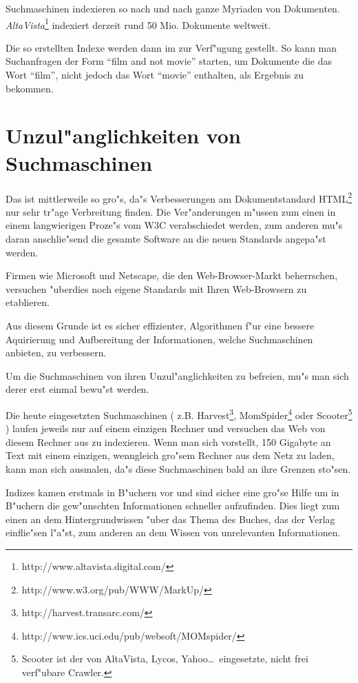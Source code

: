 Suchmaschinen indexieren so nach und nach ganze Myriaden von Dokumenten. {\em AltaVista}\footnote{http://www.altavista.digital.com/} indexiert derzeit rund 50 Mio. Dokumente weltweit.

Die so erstellten Indexe werden dann im \www zur Verf"ugung gestellt. So kann man Suchanfragen der Form "`film and not movie"'  starten, um Dokumente die das Wort "`film"', nicht jedoch das Wort "`movie"' enthalten, als Ergebnis zu bekommen.


\section{Unzul"anglichkeiten von Suchmaschinen}
Das \www ist mittlerweile so gro"s, da"s Verbesserungen am Dokumentstandard HTML\footnote{http://www.w3.org/pub/WWW/MarkUp/} nur sehr tr"age Verbreitung finden. Die Ver"anderungen m"ussen zum einen in einem langwierigen Proze"s vom W3C verabschiedet werden, zum anderen mu"s daran anschlie"send die gesamte Software an die neuen Standards angepa"st werden.

Firmen wie Microsoft und Netscape, die den Web-Browser-Markt beherrschen, versuchen "uberdies noch eigene Standards mit Ihren Web-Browsern zu etablieren.

Aus diesem Grunde ist es sicher effizienter, Algorithmen f"ur eine bessere Aquirierung und Aufbereitung der Informationen, welche Suchmaschinen anbieten, zu verbessern.

Um die Suchmaschinen von ihren Unzul"anglichkeiten zu befreien, mu"s man sich derer erst einmal bewu"st werden.

Die heute eingesetzten Suchmaschinen ( z.B. Harvest\footnote{http://harvest.transarc.com/}, MomSpider\footnote{http://www.ics.uci.edu/pub/websoft/MOMspider/} oder Scooter\footnote{Scooter ist der von AltaVista, Lycos, Yahoo\dots \ eingesetzte, nicht frei verf"ubare Crawler.} ) laufen jeweils nur auf einem einzigen Rechner und versuchen das Web von diesem Rechner aus zu indexieren. Wenn man sich vorstellt, 150 Gigabyte an Text mit einem einzigen, wenngleich gro"sem Rechner aus dem Netz zu laden, kann man sich ausmalen, da"s diese Suchmaschinen bald an ihre Grenzen sto"sen.

Indizes kamen erstmals in B"uchern vor und sind sicher eine gro"se Hilfe um in B"uchern die gew"unschten Informationen schneller aufzufinden. Dies liegt zum einen an dem Hintergrundwissen "uber das Thema des Buches, das der Verlag einflie"sen l"a"st, zum anderen an dem Wissen von unrelevanten Informationen.

